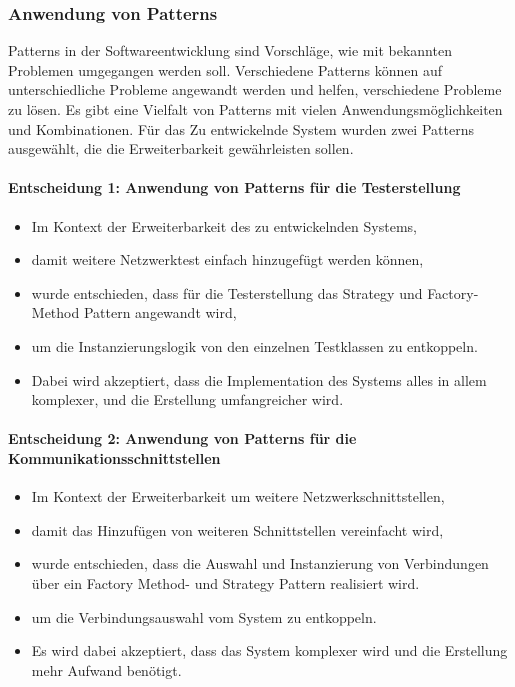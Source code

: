 \documentclass[
	ngerman,
	toc=listof, %
	toc=bibliography, %
	footnotes=multiple, %
	parskip=half, %
	numbers=noendperiod %
]{scrartcl}
\begin{document}
		\subsubsection{Anwendung von Patterns}
		Patterns in der Softwareentwicklung sind Vorschläge, wie mit bekannten Problemen umgegangen werden soll.
		Verschiedene Patterns können auf unterschiedliche Probleme angewandt werden und helfen, verschiedene Probleme zu lösen.
		Es gibt eine Vielfalt von Patterns mit vielen Anwendungsmöglichkeiten und Kombinationen.
		Für das Zu entwickelnde System wurden zwei Patterns ausgewählt, die die Erweiterbarkeit gewährleisten sollen.

		\paragraph{Entscheidung 1: Anwendung von Patterns für die Testerstellung}
		\begin{itemize}
			\item Im Kontext der Erweiterbarkeit des zu entwickelnden Systems,
			\item damit weitere Netzwerktest einfach hinzugefügt werden können,
			\item wurde entschieden, dass für die Testerstellung das Strategy und Factory-Method Pattern angewandt wird,
			\item um die Instanzierungslogik von den einzelnen Testklassen zu entkoppeln.
			\item Dabei wird akzeptiert, dass die Implementation des Systems alles in allem komplexer, und die Erstellung umfangreicher wird.			
		\end{itemize}

		\paragraph{Entscheidung 2: Anwendung von Patterns für die Kommunikationsschnittstellen}
		\begin{itemize}
			\item Im Kontext der Erweiterbarkeit um weitere Netzwerkschnittstellen,
			\item damit das Hinzufügen von weiteren Schnittstellen vereinfacht wird,
			\item wurde entschieden, dass die Auswahl und Instanzierung von Verbindungen über ein Factory Method- und Strategy Pattern realisiert wird.
			\item um die Verbindungsauswahl vom System zu entkoppeln.
			\item Es wird dabei akzeptiert, dass das System komplexer wird und die Erstellung mehr Aufwand benötigt.
		\end{itemize}
\end{document}
